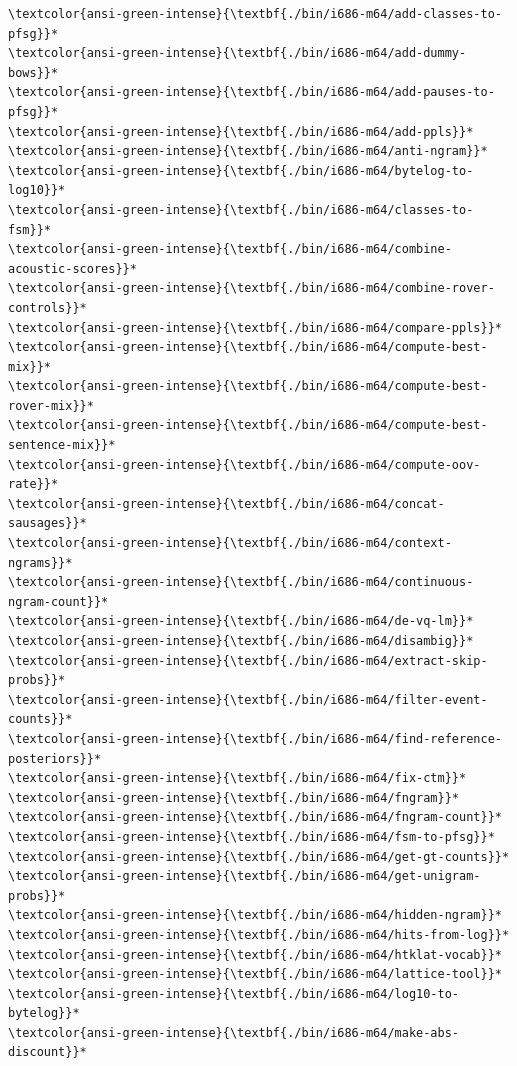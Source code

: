 \documentclass[11pt]{article}
\begin{document}
    \begin{Verbatim}[commandchars=\\\{\}]
\textcolor{ansi-green-intense}{\textbf{./bin/i686-m64/add-classes-to-pfsg}}*
\textcolor{ansi-green-intense}{\textbf{./bin/i686-m64/add-dummy-bows}}*
\textcolor{ansi-green-intense}{\textbf{./bin/i686-m64/add-pauses-to-pfsg}}*
\textcolor{ansi-green-intense}{\textbf{./bin/i686-m64/add-ppls}}*
\textcolor{ansi-green-intense}{\textbf{./bin/i686-m64/anti-ngram}}*
\textcolor{ansi-green-intense}{\textbf{./bin/i686-m64/bytelog-to-log10}}*
\textcolor{ansi-green-intense}{\textbf{./bin/i686-m64/classes-to-fsm}}*
\textcolor{ansi-green-intense}{\textbf{./bin/i686-m64/combine-acoustic-scores}}*
\textcolor{ansi-green-intense}{\textbf{./bin/i686-m64/combine-rover-controls}}*
\textcolor{ansi-green-intense}{\textbf{./bin/i686-m64/compare-ppls}}*
\textcolor{ansi-green-intense}{\textbf{./bin/i686-m64/compute-best-mix}}*
\textcolor{ansi-green-intense}{\textbf{./bin/i686-m64/compute-best-rover-mix}}*
\textcolor{ansi-green-intense}{\textbf{./bin/i686-m64/compute-best-sentence-mix}}*
\textcolor{ansi-green-intense}{\textbf{./bin/i686-m64/compute-oov-rate}}*
\textcolor{ansi-green-intense}{\textbf{./bin/i686-m64/concat-sausages}}*
\textcolor{ansi-green-intense}{\textbf{./bin/i686-m64/context-ngrams}}*
\textcolor{ansi-green-intense}{\textbf{./bin/i686-m64/continuous-ngram-count}}*
\textcolor{ansi-green-intense}{\textbf{./bin/i686-m64/de-vq-lm}}*
\textcolor{ansi-green-intense}{\textbf{./bin/i686-m64/disambig}}*
\textcolor{ansi-green-intense}{\textbf{./bin/i686-m64/extract-skip-probs}}*
\textcolor{ansi-green-intense}{\textbf{./bin/i686-m64/filter-event-counts}}*
\textcolor{ansi-green-intense}{\textbf{./bin/i686-m64/find-reference-posteriors}}*
\textcolor{ansi-green-intense}{\textbf{./bin/i686-m64/fix-ctm}}*
\textcolor{ansi-green-intense}{\textbf{./bin/i686-m64/fngram}}*
\textcolor{ansi-green-intense}{\textbf{./bin/i686-m64/fngram-count}}*
\textcolor{ansi-green-intense}{\textbf{./bin/i686-m64/fsm-to-pfsg}}*
\textcolor{ansi-green-intense}{\textbf{./bin/i686-m64/get-gt-counts}}*
\textcolor{ansi-green-intense}{\textbf{./bin/i686-m64/get-unigram-probs}}*
\textcolor{ansi-green-intense}{\textbf{./bin/i686-m64/hidden-ngram}}*
\textcolor{ansi-green-intense}{\textbf{./bin/i686-m64/hits-from-log}}*
\textcolor{ansi-green-intense}{\textbf{./bin/i686-m64/htklat-vocab}}*
\textcolor{ansi-green-intense}{\textbf{./bin/i686-m64/lattice-tool}}*
\textcolor{ansi-green-intense}{\textbf{./bin/i686-m64/log10-to-bytelog}}*
\textcolor{ansi-green-intense}{\textbf{./bin/i686-m64/make-abs-discount}}*

\end{Verbatim}
\end{document}
